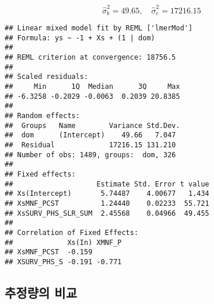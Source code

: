 \documentclass[
]{book}
\newenvironment{Shaded}{\begin{snugshade}}{\end{snugshade}}
\newcommand{\DecValTok}[1]{\textcolor[rgb]{0.00,0.00,0.81}{#1}}
\newcommand{\FunctionTok}[1]{\textcolor[rgb]{0.00,0.00,0.00}{#1}}
\newcommand{\NormalTok}[1]{#1}
\newcommand{\OtherTok}[1]{\textcolor[rgb]{0.56,0.35,0.01}{#1}}
\newcommand{\SpecialCharTok}[1]{\textcolor[rgb]{0.00,0.00,0.00}{#1}}
\newcommand{\StringTok}[1]{\textcolor[rgb]{0.31,0.60,0.02}{#1}}
\begin{document}
\[ \hat \sigma^2_b =49.65, \quad \hat \sigma^2_e = 17216.15 \]

\begin{Shaded}
\end{Shaded}

\begin{verbatim}
## Linear mixed model fit by REML ['lmerMod']
## Formula: ys ~ -1 + Xs + (1 | dom)
## 
## REML criterion at convergence: 18756.5
## 
## Scaled residuals: 
##     Min      1Q  Median      3Q     Max 
## -6.3258 -0.2029 -0.0063  0.2039 20.8385 
## 
## Random effects:
##  Groups   Name        Variance Std.Dev.
##  dom      (Intercept)    49.66   7.047 
##  Residual             17216.15 131.210 
## Number of obs: 1489, groups:  dom, 326
## 
## Fixed effects:
##                    Estimate Std. Error t value
## Xs(Intercept)       5.74487    4.00677   1.434
## XsMNF_PCST          1.24440    0.02233  55.721
## XsSURV_PHS_SLR_SUM  2.45568    0.04966  49.455
## 
## Correlation of Fixed Effects:
##             Xs(In) XMNF_P
## XsMNF_PCST  -0.159       
## XSURV_PHS_S -0.191 -0.771
\end{verbatim}

\hypertarget{uxcd94uxc815uxb7c9uxc758-uxbe44uxad50}{%
\subsection{추정량의 비교}\label{uxcd94uxc815uxb7c9uxc758-uxbe44uxad50}}

\begin{Shaded}
\end{Shaded}
\end{document}

